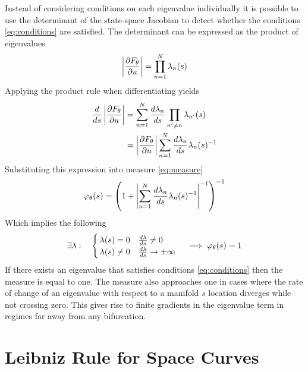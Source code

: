 Instead of considering conditions on each eigenvalue individually it is possible to use the determinant of the state-space Jacobian to detect whether the conditions \eqref{eq:conditions} are satisfied. The determinant can be expressed as the product of eigenvalues
\begin{equation}
    \left| \frac{\partial F_{\theta}}{\partial u} \right|=\prod_{n=1}^N\lambda_n(s)
    \label{eq:determinant}
\end{equation}
Applying the product rule when differentiating yields
\begin{align}
    \frac{d}{ds}\left| \frac{\partial F_{\theta}}{\partial u} \right|&=
    \sum_{n=1}^N\frac{d\lambda_n}{ds}\prod_{n'\neq n}\lambda_{n'}(s)\\
    &=\left| \frac{\partial F_{\theta}}{\partial u} \right|\sum_{n=1}^N\frac{d\lambda_n}{ds}\lambda_{n}(s)^{-1}
\end{align}
Substituting this expression into measure \eqref{eq:measure}
\begin{equation}
    \varphi_{\theta}(s)=
    \left(1+\left|\sum_{n=1}^N\frac{d\lambda_n}{ds}\lambda_{n}(s)^{-1}\right|^{-1}\right)^{-1}
\end{equation}
Which implies the following
\begin{equation}
    \exists\lambda:\quad
    \begin{cases}
        \,\lambda(s)=0 \quad\frac{d\lambda}{ds}\neq 0\\
        \,\lambda(s)\neq0 \quad\frac{d\lambda}{ds}\rightarrow\pm\infty
    \end{cases}
    \implies
    \varphi_{\theta}(s)=1
    \label{eq:measure-conditions}
\end{equation}
If there exists an eigenvalue that satisfies conditions \eqref{eq:conditions} then the measure is equal to one. The measure also approaches one in cases where the rate of change of an eigenvalue with respect to a manifold $s$ location  diverges while not crossing zero. This gives rise to finite gradients in the eigenvalue term in regimes far away from any bifurcation.

\section{Leibniz Rule for Space Curves}
\label{appendix:leibniz-rule}


